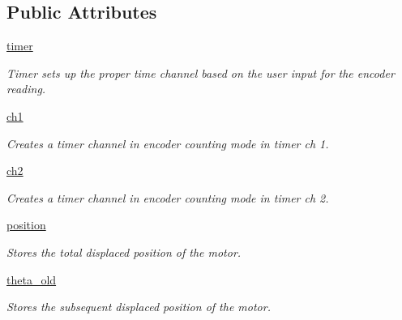\subsection*{Public Attributes}
\begin{DoxyCompactItemize}
\item 
\mbox{\label{classEncoderDriver_1_1Encoder_ade9e13ac188b468f151a2f266a63f396}} 
\mbox{\hyperlink{classEncoderDriver_1_1Encoder_ade9e13ac188b468f151a2f266a63f396}{timer}}
\begin{DoxyCompactList}\small\item\em Timer sets up the proper time channel based on the user input for the encoder reading. \end{DoxyCompactList}\item 
\mbox{\label{classEncoderDriver_1_1Encoder_a8c9e589d20e5815c98f2d0fa2921f0ee}} 
\mbox{\hyperlink{classEncoderDriver_1_1Encoder_a8c9e589d20e5815c98f2d0fa2921f0ee}{ch1}}
\begin{DoxyCompactList}\small\item\em Creates a timer channel in encoder counting mode in timer ch 1. \end{DoxyCompactList}\item 
\mbox{\label{classEncoderDriver_1_1Encoder_a5fddacdc4b22545c5dbdc5225699d538}} 
\mbox{\hyperlink{classEncoderDriver_1_1Encoder_a5fddacdc4b22545c5dbdc5225699d538}{ch2}}
\begin{DoxyCompactList}\small\item\em Creates a timer channel in encoder counting mode in timer ch 2. \end{DoxyCompactList}\item 
\mbox{\label{classEncoderDriver_1_1Encoder_a9be581feeefcba826bf611922d2b6f4a}} 
\mbox{\hyperlink{classEncoderDriver_1_1Encoder_a9be581feeefcba826bf611922d2b6f4a}{position}}
\begin{DoxyCompactList}\small\item\em Stores the total displaced position of the motor. \end{DoxyCompactList}\item 
\mbox{\label{classEncoderDriver_1_1Encoder_aa685e1ab0c7d2650ab2bd19f0ed6c467}} 
\mbox{\hyperlink{classEncoderDriver_1_1Encoder_aa685e1ab0c7d2650ab2bd19f0ed6c467}{theta\+\_\+old}}
\begin{DoxyCompactList}\small\item\em Stores the subsequent displaced position of the motor. \end{DoxyCompactList}\end{DoxyCompactItemize}


